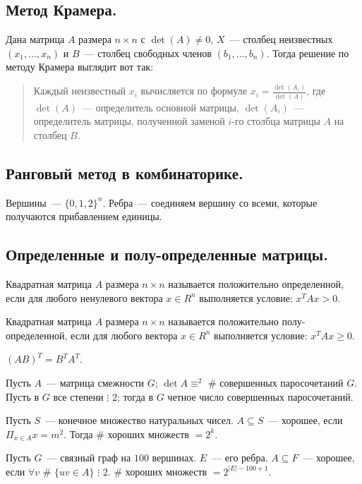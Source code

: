 \documentclass[12pt]{article}
\begin{document}
	\subsection{Метод Крамера.}
	\begin{method}[Крамера]
		Дана матрица $A$ размера $n \times n$ с $\det(A) \not= 0$, $X$~--- столбец неизвестных $(x_1, \dots, x_n)$ и $B$~--- столбец свободных членов $(b_1, \dots, b_n)$. Тогда решение по методу Крамера выглядит вот так:
		\begin{quote}
			Каждый неизвестный $x_i$ вычисляется по формуле $x_i = \frac{\det(A_i)}{\det(A)}$, где $\det(A)$~--- определитель основной матрицы, $\det(A_i)$~--- определитель матрицы, полученной заменой $i$-го столбца матрицы $A$ на столбец $B$.
		\end{quote}
	\end{method}
	\subsection{Ранговый метод в комбинаторике.}
	Вершины~--- $\{ 0, 1, 2 \}^n$. Ребра~--- соединяем вершину со всеми, которые получаются прибавлением единицы.
	\subsection{Определенные и полу-определенные матрицы.}
	\begin{definition}
		Квадратная матрица $A$ размера $n \times n$ называется положительно определенной, если для любого ненулевого вектора $x \in R^n$ выполняется условие: $x^T A x > 0$.
	\end{definition}
	\begin{definition}
		Квадратная матрица $A$ размера $n \times n$ называется положительно полу-определенной, если для любого вектора $x \in R^n$ выполняется условие: $x^T A x \geqslant 0$.
	\end{definition}
	\begin{statement}
		$(AB)^T=B^TA^T$.
	\end{statement}
	\begin{statement}
		Пусть $A$~--- матрица смежности $G$; $\det A \equiv^2$ \# совершенных паросочетаний $G$. \\
		Пусть в $G$ все степени $\vdots$ $2$; тогда в $G$ четное число совершенных паросочетаний.
	\end{statement}
	\begin{statement}
		Пусть $S$~--- конечное множество натуральных чисел. $A \subseteq S$~--- хорошее, если $\Pi_{x \in A} x = m^2$. Тогда \# хороших множеств $= 2^k$.
	\end{statement}
	\begin{statement}
		Пусть $G$~--- связный граф на $100$ вершинах. $E$~--- его ребра. $A \subseteq F$~--- хорошее, если $\forall v$ \# $\{ uv \in A \}$ $\vdots$ $2$. \# хороших множеств $= 2^{|E| - 100 + 1}$.
	\end{statement}
	
\end{document}
